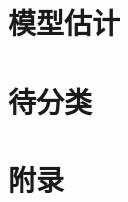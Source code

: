 \documentclass[10pt,a4paper,UTF8]{ctexbook}
\begin{document}
\part{模型估计}


\part{待分类}

\part{附录}
\begin{appendices}
\appendixpage
\noappendicestocpagenum
\addappheadtotoc



\end{appendices}
\newpage{}

%

\listoffigures
\listoftables
\listoftodos
\printindex
\end{document}
